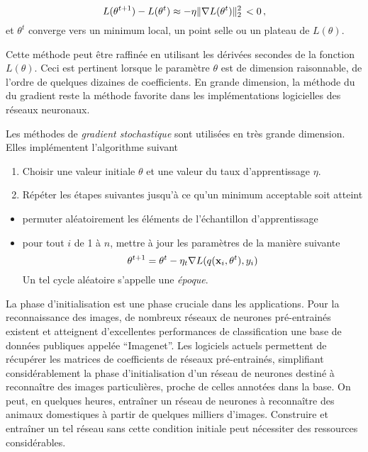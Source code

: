\documentclass[]{article}
\providecommand{\tightlist}{%
  \setlength{\itemsep}{0pt}\setlength{\parskip}{0pt}}
\begin{document}
\[
L(\theta^{t+1}) - L(\theta^t) \approx - \eta \| {\bf \nabla} L(\theta^t) \|_2^2 \,  < 0 \,,
\] et \(\theta^t\) converge vers un minimum local, un point selle ou un
plateau de \(L(\theta)\).

Cette méthode peut être raffinée en utilisant les dérivées secondes de
la fonction \(L(\theta)\). Ceci est pertinent lorsque le paramètre
\(\theta\) est de dimension raisonnable, de l'ordre de quelques dizaines
de coefficients. En grande dimension, la méthode du du gradient reste la
méthode favorite dans les implémentations logicielles des réseaux
neuronaux.

Les méthodes de \emph{gradient stochastique} sont utilisées en très
grande dimension. Elles implémentent l'algorithme suivant

\begin{enumerate}
\def\labelenumi{\arabic{enumi}.}
\tightlist
\item
  Choisir une valeur initiale \(\theta\) et une valeur du taux
  d'apprentissage \(\eta\).
\item
  Répéter les étapes suivantes jusqu'à ce qu'un minimum acceptable soit
  atteint
\end{enumerate}

\begin{itemize}
\tightlist
\item
  permuter aléatoirement les éléments de l'échantillon d'apprentissage
\item
  pour tout \(i\) de 1 à \(n\), mettre à jour les paramètres de la
  manière suivante \[
  \theta^{t+1} = \theta^{t} - \eta_t  \nabla L(q({\bf x}_i , \theta^t), y_i) 
  \] Un tel cycle aléatoire s'appelle une \emph{époque}.
\end{itemize}

La phase d'initialisation est une phase cruciale dans les applications.
Pour la reconnaissance des images, de nombreux réseaux de neurones
pré-entrainés existent et atteignent d'excellentes performances de
classification une base de données publiques appelée ``Imagenet''. Les
logiciels actuels permettent de récupérer les matrices de coefficients
de réseaux pré-entrainés, simplifiant considérablement la phase
d'initialisation d'un réseau de neurones destiné à reconnaître des
images particulières, proche de celles annotées dans la base. On peut,
en quelques heures, entraîner un réseau de neurones à reconnaître des
animaux domestiques à partir de quelques milliers d'images. Construire
et entraîner un tel réseau sans cette condition initiale peut nécessiter
des ressources considérables.
\end{document}
